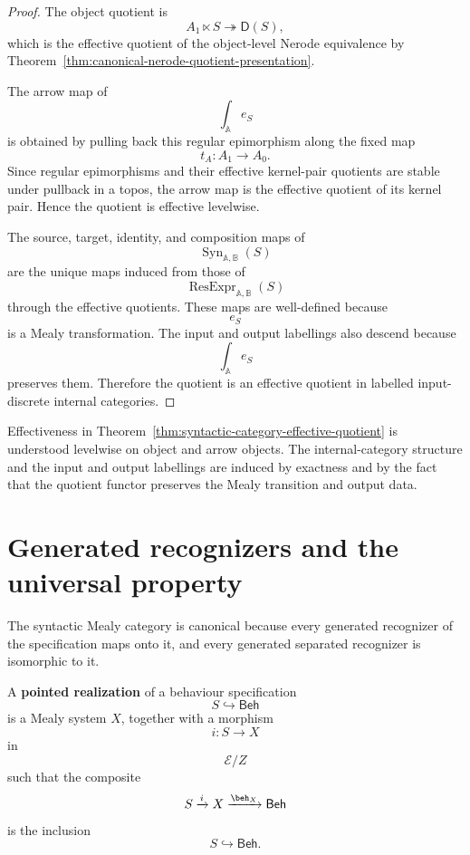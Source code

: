 \begin{proof}
The object quotient is
\[
A_1\ltimes S\twoheadrightarrow\mathsf D(S),
\]
which is the effective quotient of the object-level Nerode equivalence by
Theorem~\ref{thm:canonical-nerode-quotient-presentation}.

The arrow map of
\[
\int_{\mathbb A}e_S
\]
is obtained by pulling back this regular epimorphism along the fixed map
\[
t_A:A_1\to A_0.
\]
Since regular epimorphisms and their effective kernel-pair quotients are
stable under pullback in a topos, the arrow map is the effective quotient of
its kernel pair. Hence the quotient is effective levelwise.

The source, target, identity, and composition maps of
\[
\operatorname{Syn}_{\mathbb A,\mathbb B}(S)
\]
are the unique maps induced from those of
\[
\operatorname{ResExpr}_{\mathbb A,\mathbb B}(S)
\]
through the effective quotients. These maps are well-defined because
\[
e_S
\]
is a Mealy transformation. The input and output labellings also descend
because
\[
\int_{\mathbb A}e_S
\]
preserves them. Therefore the quotient is an effective quotient in labelled
input-discrete internal categories.
\end{proof}

\begin{remark}
\label{rem:levelwise-effectiveness-syntactic-category}
Effectiveness in
Theorem~\ref{thm:syntactic-category-effective-quotient} is understood
levelwise on object and arrow objects. The internal-category structure and
the input and output labellings are induced by exactness and by the fact that
the quotient functor preserves the Mealy transition and output data.
\end{remark}

\section{Generated recognizers and the universal property}
\label{sec:generated-recognizers-universal-property}

The syntactic Mealy category is canonical because every generated recognizer
of the specification maps onto it, and every generated separated recognizer is
isomorphic to it.

\begin{definition}
\label{def:pointed-realization}
A \textbf{pointed realization} of a behaviour specification
\[
S\hookrightarrow\mathsf{Beh}
\]
is a Mealy system \(X\), together with a morphism
\[
i:S\to X
\]
in
\[
\mathcal E/Z
\]
such that the composite
\[
S\xrightarrow{i}X\xrightarrow{\beh_X}\mathsf{Beh}
\]
is the inclusion
\[
S\hookrightarrow\mathsf{Beh}.
\]
\end{definition}

